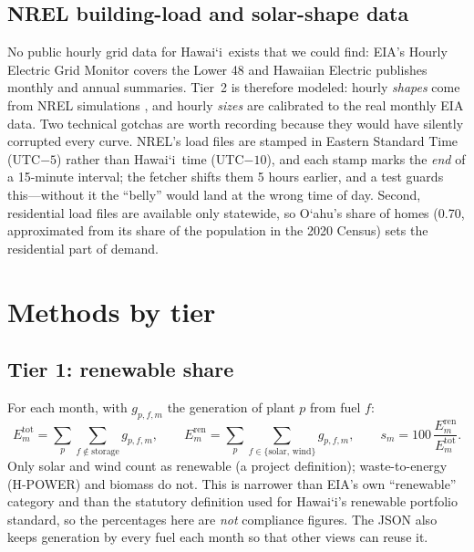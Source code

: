 \documentclass[11pt,a4paper]{article}
\newcommand{\okina}{\textquoteleft}
\newcommand{\Oahu}{\texorpdfstring{O\okina ahu}{Oahu}}
\newcommand{\Hawaii}{\texorpdfstring{Hawai\okina i}{Hawaii}}
\begin{document}
\subsection{NREL building-load and solar-shape data}
No public hourly grid data for \Hawaii\ exists that we could find: EIA's Hourly Electric Grid Monitor
covers the Lower 48 \cite{gridmonitor} and Hawaiian Electric publishes monthly and annual summaries. Tier~2 is
therefore modeled: hourly \emph{shapes} come from NREL simulations \cite{nrel-eulp,pvwatts}, and hourly \emph{sizes} are calibrated to the
real monthly EIA data. Two technical gotchas are worth recording because they would have silently corrupted every
curve. NREL's load files are stamped in Eastern Standard Time (UTC$-5$) rather than \Hawaii\ time (UTC$-10$), and
each stamp marks the \emph{end} of a 15-minute interval; the fetcher shifts them 5 hours earlier, and a test
guards this---without it the ``belly'' would land at the wrong time of day. Second, residential load files are
available only statewide, so \Oahu's share of homes (0.70, approximated from its share of the population in the
2020 Census) sets the residential part of demand.

\section{Methods by tier}
\label{sec:methods}

\subsection{Tier 1: renewable share}
For each month, with $g_{p,f,m}$ the generation of plant $p$ from fuel $f$:
\begin{equation}
E^{\text{tot}}_m=\sum_{p}\sum_{f\notin\text{storage}} g_{p,f,m},\qquad
E^{\text{ren}}_m=\sum_{p}\sum_{f\in\{\text{solar},\,\text{wind}\}} g_{p,f,m},\qquad
s_m=100\,\frac{E^{\text{ren}}_m}{E^{\text{tot}}_m}.
\end{equation}
Only solar and wind count as renewable (a project definition); waste-to-energy (H-POWER) and biomass do not.
This is narrower than EIA's own ``renewable'' category and than the statutory definition used for
\Hawaii's renewable portfolio standard, so the percentages here are \emph{not} compliance figures. The JSON also
keeps generation by every fuel each month so that other views can reuse it.
\end{document}

